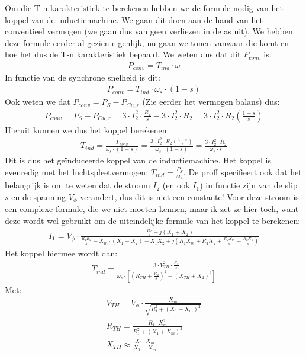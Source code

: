 Om die T-n karakteristiek te berekenen hebben we de formule nodig van het koppel van de
inductiemachine.
We gaan dit doen aan de hand van het conventieel vermogen (we gaan dus van geen verliezen
in de as uit).
We hebben deze formule eerder al gezien eigenlijk, nu gaan we tonen vanwaar die komt en hoe
het dus de T-n karakteristiek bepaald.
We weten dus dat dit $P_{conv}$ is:
\begin{align*}
    P_{conv} = T_{ind} \cdot \omega
\end{align*}
In functie van de synchrone snelheid is dit:
\begin{align*}
    P_{conv} = T_{ind} \cdot \omega_s \cdot (1-s)
\end{align*}
Ook weten we dat $P_{conv} = P_S - P_{Cu,r}$ (Zie eerder het vermogen balans) dus:
\begin{align*}
    P_{conv} = P_S - P_{Cu,r} = 3 \cdot I_2^2 \cdot \frac{R_2}{s} - 3 \cdot I_2^2 \cdot R_2 = 3 \cdot I_2^2 \cdot R_2 \left(\frac{1-s}{s}\right)
\end{align*}
Hieruit kunnen we dus het koppel berekenen:
\begin{align*}
    T_{ind} = \frac{P_{conv}}{\omega_s \cdot (1-s)} = \frac{3 \cdot I_2^2 \cdot R_2 \left(\frac{1-s}{s}\right)}{\omega_s \cdot (1-s)} = \frac{3 \cdot I_2^2 \cdot R_2}{\omega_s \cdot s}
\end{align*}   
Dit is dus het geïnduceerde koppel van de inductiemachine.
Het koppel is evenredig met het luchtspleetvermogen: $T_{ind} = \frac{P_S}{\omega_s}$.
De proff specifieert ook dat het belangrijk is om te weten dat de stroom $I_2$ (en ook
$I_1$) in functie zijn van de slip $s$ en de spanning $V_\phi$ verandert, dus dit is niet
een constante!
Voor deze stroom is een complexe formule, die we niet moeten kennen, maar ik zet ze hier
toch, want deze wordt wel gebruikt om de uiteindelijke formule van het koppel te
berekenen:
\begin{align*}
    I_1 = V_\phi \cdot \frac{\frac{R_2}{s} + j(X_1 + X_2)}{\frac{R_1 R_2}{s} - X_m \cdot (X_1 + X_2) - X_1 X_2 + j(R_1 X_m + R_1 X_2 + \frac{R_2 X_m}{s} + \frac{R_2 X_1}{s})}
\end{align*}
Het koppel hiermee wordt dan:
\begin{align*}
    T_{ind} = \frac{3 \cdot V_{TH}^2 \cdot \frac{R_2}{s}}{\omega_s \cdot [\left(R_{TH} + \frac{R_2}{s}\right)^2 + (X_{TH} + X_2)^2]}
\end{align*}
Met:
\begin{align*}
    V_{TH} = V_\phi \cdot \frac{X_m}{\sqrt{R_1^2 + (X_1 + X_m)^2}} \\
    R_{TH} = \frac{R_1 \cdot X_m^2}{R_1^2 + (X_1 + X_m)^2} \\
    X_{TH} \approx \frac{X_1 \cdot X_m}{X_1 + X_m}
\end{align*}
